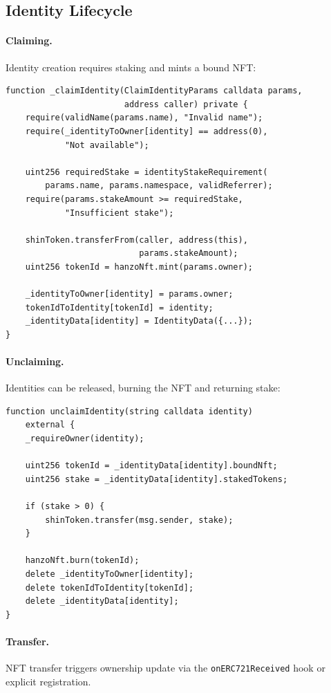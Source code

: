 \documentclass[11pt,twocolumn]{article}
\begin{document}
\subsection{Identity Lifecycle}

\paragraph{Claiming.} Identity creation requires staking and mints a bound NFT:

\begin{lstlisting}[language=Solidity]
function _claimIdentity(ClaimIdentityParams calldata params,
                        address caller) private {
    require(validName(params.name), "Invalid name");
    require(_identityToOwner[identity] == address(0),
            "Not available");

    uint256 requiredStake = identityStakeRequirement(
        params.name, params.namespace, validReferrer);
    require(params.stakeAmount >= requiredStake,
            "Insufficient stake");

    shinToken.transferFrom(caller, address(this),
                           params.stakeAmount);
    uint256 tokenId = hanzoNft.mint(params.owner);

    _identityToOwner[identity] = params.owner;
    tokenIdToIdentity[tokenId] = identity;
    _identityData[identity] = IdentityData({...});
}
\end{lstlisting}

\paragraph{Unclaiming.} Identities can be released, burning the NFT and returning stake:

\begin{lstlisting}[language=Solidity]
function unclaimIdentity(string calldata identity)
    external {
    _requireOwner(identity);

    uint256 tokenId = _identityData[identity].boundNft;
    uint256 stake = _identityData[identity].stakedTokens;

    if (stake > 0) {
        shinToken.transfer(msg.sender, stake);
    }

    hanzoNft.burn(tokenId);
    delete _identityToOwner[identity];
    delete tokenIdToIdentity[tokenId];
    delete _identityData[identity];
}
\end{lstlisting}

\paragraph{Transfer.} NFT transfer triggers ownership update via the \texttt{onERC721Received} hook or explicit registration.
\end{document}
